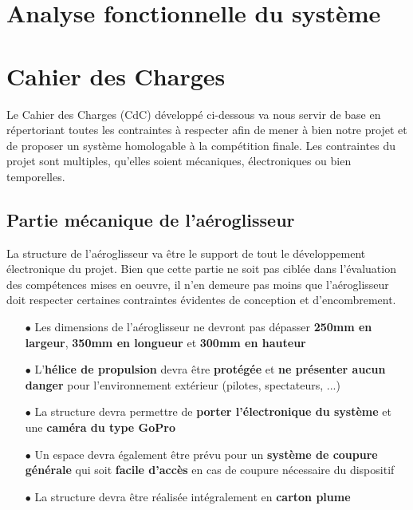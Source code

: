 \documentclass[a4paper,12pt]{report}
\begin{document}
	\section{Analyse fonctionnelle du système}
	
	\newpage
	
	\section{Cahier des Charges}
	
	\vspace{-1em}
	
	Le Cahier des Charges (CdC) développé ci-dessous va nous servir de base en répertoriant toutes les contraintes à respecter afin de mener à bien notre projet et de proposer un système homologable à la compétition finale. Les contraintes du projet sont multiples, qu'elles soient mécaniques, électroniques ou bien temporelles.
	
	\vspace{-1em}
	
		\subsection{Partie mécanique de l'aéroglisseur}
		
		\vspace{-1em}
		
		La structure de l'aéroglisseur va être le support de tout le développement électronique du projet. Bien que cette partie ne soit pas ciblée dans l'évaluation des compétences mises en oeuvre, il n'en demeure pas moins que l'aéroglisseur doit respecter certaines contraintes évidentes de conception et d'encombrement.
		
		\begin{itemize}
			\item[$\bullet$] Les dimensions de l'aéroglisseur ne devront pas dépasser \textbf{250mm en largeur}, \textbf{350mm en longueur} et \textbf{300mm en hauteur}
			\item[$\bullet$] L'\textbf{hélice de propulsion} devra être \textbf{protégée} et \textbf{ne présenter aucun danger} pour l'environnement extérieur (pilotes, spectateurs, ...)
			\item[$\bullet$] La structure devra permettre de \textbf{porter l'électronique du système} et une \textbf{caméra du type GoPro}
			\item[$\bullet$] Un espace devra également être prévu pour un \textbf{système de coupure générale} qui soit \textbf{facile d'accès} en cas de coupure nécessaire du dispositif
			\item[$\bullet$] La structure devra être réalisée intégralement en \textbf{carton plume}
		\end{itemize}
		
\end{document}
